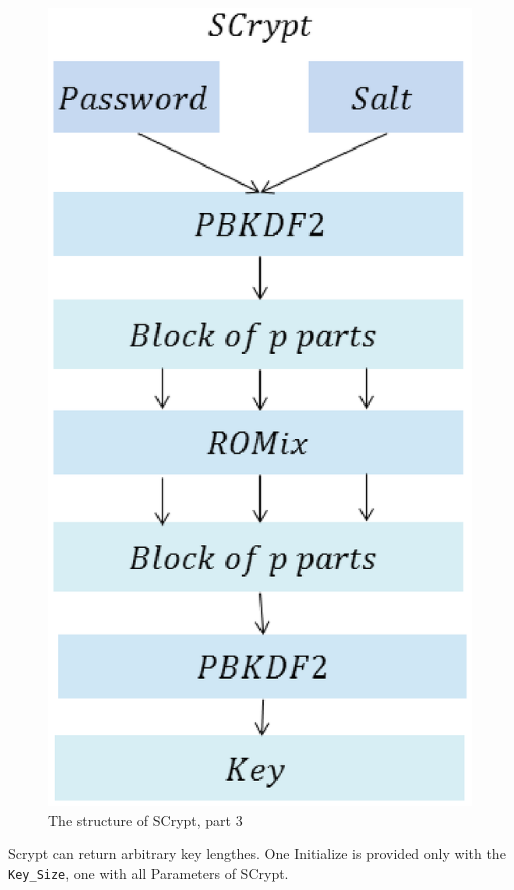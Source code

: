 \begin{figure}[ht!]
\centering
\includegraphics[width=150mm]{./images/Scryptc}
\caption{The structure of SCrypt, part 3}
\end{figure}

Scrypt can return arbitrary key lengthes. One Initialize is provided only with the \texttt{Key\_Size}, one with all Parameters of SCrypt.


